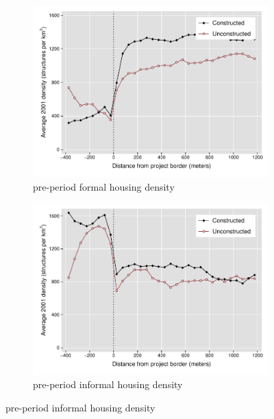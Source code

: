 \documentclass[12pt]{article}
\begin{document}
\begin{figure}[h!]
        \centering
        \caption[ Pre-Period Housing Densities in Constructed and Unconstructed Projects Areas ]
        {\small Pre-Period Housing Densities in Constructed and Unconstructed projects } 
        \begin{subfigure}[b]{0.495\textwidth}
            \centering
            \includegraphics[width=\textwidth,trim={0.3cm .3cm 0.1cm 0cm}, clip=true]{figures/bblu_for_pre_means_3}
            \caption[Network2]%
            {{\small pre-period formal housing density}}    
            \label{fig:prefor}
        \end{subfigure}
        \hfill
        \begin{subfigure}[b]{0.495\textwidth}  
            \centering 
            \includegraphics[width=\textwidth,trim={0.3cm .3cm 0.1cm 0cm}, clip=true]{figures/bblu_inf_pre_means_3}
            \caption[]%
            {{\small pre-period informal housing density}}    
            \label{fig:preinf}
        \end{subfigure}
        \label{fig:rawbblumeans}
        \vspace{-6mm}
    \end{figure} 
\end{document}
